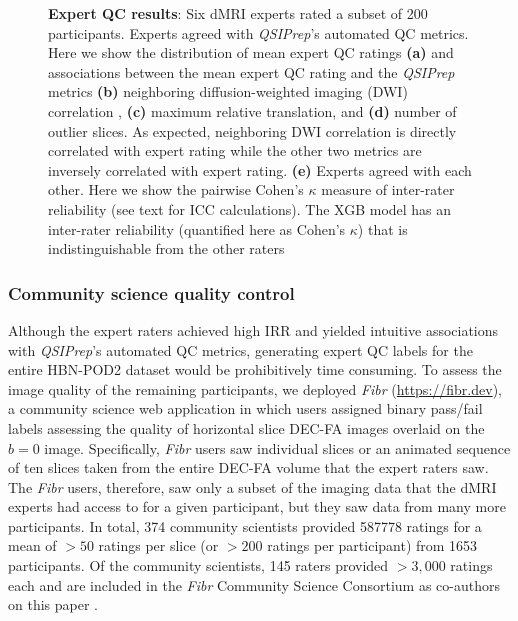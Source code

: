 \documentclass[9pt,lineno]{elife}
\begin{document}
\begin{figure}[tbp]
\begin{fullwidth}
\begin{subfigure}{.4\linewidth}
    \end{subfigure}
    \caption{%
        {\bf Expert QC results}:
        Six dMRI experts rated a subset of \num{200} participants.  Experts agreed
        with \emph{QSIPrep}'s automated QC metrics.  Here we show the
        distribution of mean expert QC ratings \textbf{(a)} and associations
        between the mean expert QC rating and the \emph{QSIPrep} metrics
        \textbf{(b)} neighboring diffusion-weighted imaging (DWI) correlation 
        \citep{yeh2019-kb}, \textbf{(c)} maximum relative translation, and
        \textbf{(d)} number of outlier slices. As expected, neighboring DWI correlation is directly
        correlated with expert rating while the other two metrics are inversely
        correlated with expert rating.
        \textbf{(e)} Experts agreed with each other. Here we show the pairwise
        Cohen's $\kappa$ measure of inter-rater reliability (see text for ICC
        calculations). The XGB model has an inter-rater reliability (quantified
        here as Cohen's $\kappa$) that is indistinguishable from the other
        raters
    }
    \label{fig:expert-qc}
\end{fullwidth}
\end{figure}

\subsubsection{Community science quality control}

Although the expert raters achieved high IRR and yielded intuitive associations
with \emph{QSIPrep}'s automated QC metrics, generating expert QC labels for the
entire HBN-POD2 dataset would be prohibitively time consuming. To assess the
image quality of the remaining participants, we deployed \emph{Fibr}
(\url{https://fibr.dev}), a community science web application in which users
assigned binary pass/fail labels assessing the quality of horizontal slice DEC-FA
images overlaid on the $b=0$ image. Specifically, \emph{Fibr} users saw individual
slices or an animated sequence of ten slices taken from the entire DEC-FA volume
that the expert raters saw. The \emph{Fibr} users, therefore, saw only a subset of
the imaging data that the dMRI experts had access to for a given participant, but they
saw data from many more participants. In total, \num{374} community scientists provided
\num{587778} ratings for a mean of $>50$ ratings per slice (or $>200$ ratings
per participant) from \num{1653} participants. Of the community scientists, \num{145}
raters provided $>3,000$ ratings each and are included in the \emph{Fibr} Community
Science Consortium as co-authors on this paper \citep{Ward-Fear2020-zq}.
\end{document}
